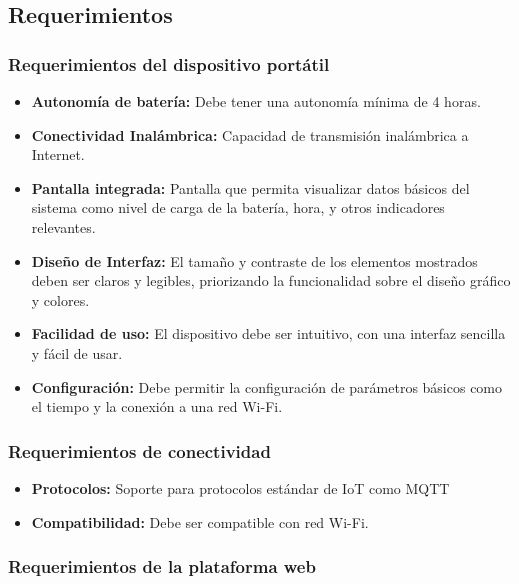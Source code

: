 \subsection{Requerimientos}


\subsubsection{Requerimientos del dispositivo portátil}

\begin{itemize}

    \item \textbf{Autonomía de batería: }Debe tener una autonomía mínima de 4 horas.
    \item \textbf{Conectividad Inalámbrica:} Capacidad de transmisión inalámbrica a Internet.
    \item \textbf{Pantalla integrada:} Pantalla que permita visualizar datos básicos del sistema como nivel de carga de la batería, hora, y otros indicadores relevantes.
    \item \textbf{Diseño de Interfaz:} El tamaño y contraste de los elementos mostrados deben ser claros y legibles, priorizando la funcionalidad sobre el diseño gráfico y colores.
    \item \textbf{Facilidad de uso:} El dispositivo debe ser intuitivo, con una interfaz sencilla y fácil de usar.
    \item \textbf{Configuración:} Debe permitir la configuración de parámetros básicos como el tiempo y la conexión a una red Wi-Fi.

\end{itemize}
\subsubsection{Requerimientos de conectividad}

\begin{itemize}

    \item \textbf{Protocolos:} Soporte para protocolos estándar de IoT como MQTT
    \item \textbf{Compatibilidad:} Debe ser compatible con red Wi-Fi.
    
\end{itemize}

\subsubsection{Requerimientos de la plataforma web}

